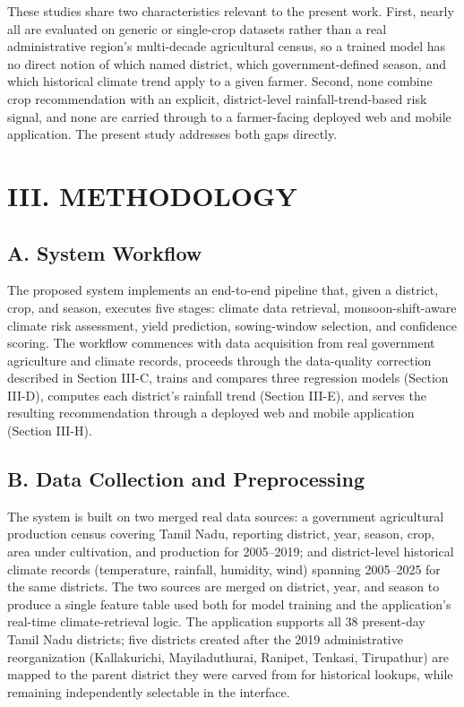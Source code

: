 \documentclass[12pt,a4paper,twocolumn]{article}
\begin{document}
These studies share two characteristics relevant to the present work. First, nearly
all are evaluated on generic or single-crop datasets rather than a real
administrative region's multi-decade agricultural census, so a trained model has no
direct notion of which named district, which government-defined season, and which
historical climate trend apply to a given farmer. Second, none combine crop
recommendation with an explicit, district-level rainfall-trend-based risk signal, and
none are carried through to a farmer-facing deployed web and mobile application. The
present study addresses both gaps directly.

\section*{III. METHODOLOGY}

\subsection*{A. System Workflow}

The proposed system implements an end-to-end pipeline that, given a district, crop,
and season, executes five stages: climate data retrieval, monsoon-shift-aware climate
risk assessment, yield prediction, sowing-window selection, and confidence scoring.
The workflow commences with data acquisition from real government agriculture and
climate records, proceeds through the data-quality correction described in Section
III-C, trains and compares three regression models (Section III-D), computes each
district's rainfall trend (Section III-E), and serves the resulting recommendation
through a deployed web and mobile application (Section III-H).

\subsection*{B. Data Collection and Preprocessing}

The system is built on two merged real data sources: a government agricultural
production census covering Tamil Nadu, reporting district, year, season, crop, area
under cultivation, and production for 2005--2019; and district-level historical
climate records (temperature, rainfall, humidity, wind) spanning 2005--2025 for the
same districts. The two sources are merged on district, year, and season to produce a
single feature table used both for model training and the application's real-time
climate-retrieval logic. The application supports all 38 present-day Tamil Nadu
districts; five districts created after the 2019 administrative reorganization
(Kallakurichi, Mayiladuthurai, Ranipet, Tenkasi, Tirupathur) are mapped to the parent
district they were carved from for historical lookups, while remaining independently
selectable in the interface.
\end{document}
